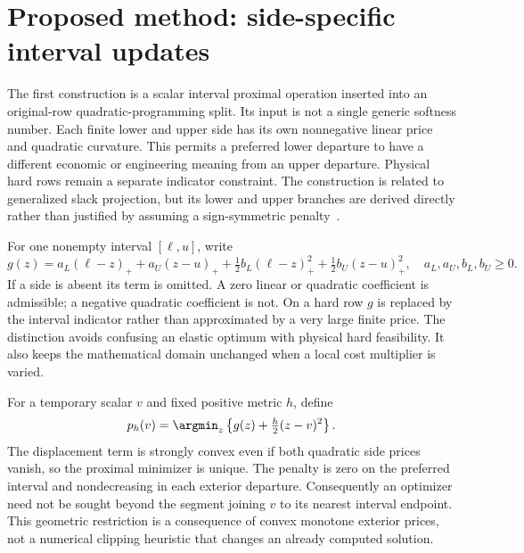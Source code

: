 \section{Proposed method: side-specific interval updates}\label{sec:separable}
The first construction is a scalar interval proximal operation inserted
into an original-row quadratic-programming split. Its input is not a
single generic softness number. Each finite lower and upper side has its
own nonnegative linear price and quadratic curvature. This permits a
preferred lower departure to have a different economic or engineering
meaning from an upper departure. Physical hard rows remain a separate
indicator constraint. The construction is related to generalized slack
projection, but its lower and upper branches are derived directly rather
than justified by assuming a sign-symmetric penalty~\cite{gsp,lew}.

For one nonempty interval $[\ell,u]$, write
\begin{equation}\label{eq:paper-side-cost}
 g(z)=a_L(\ell-z)_++a_U(z-u)_+
       +\tfrac12b_L(\ell-z)_+^2+\tfrac12b_U(z-u)_+^2,
 \quad a_L,a_U,b_L,b_U\geq0.
\end{equation}
If a side is absent its term is omitted. A zero linear or quadratic
coefficient is admissible; a negative quadratic coefficient is not. On a
hard row $g$ is replaced by the interval indicator rather than approximated
by a very large finite price. The distinction avoids confusing an elastic
optimum with physical hard feasibility. It also keeps the mathematical
domain unchanged when a local cost multiplier is varied.

For a temporary scalar $v$ and fixed positive metric $h$, define
\begin{equation}\label{eq:paper-scalar-prox}
 p_h(v)=\argmin_z\left\{g(z)+\tfrac h2(z-v)^2\right\}.
\end{equation}
The displacement term is strongly convex even if both quadratic side
prices vanish, so the proximal minimizer is unique. The penalty is zero
on the preferred interval and nondecreasing in each exterior departure.
Consequently an optimizer need not be sought beyond the segment joining
$v$ to its nearest interval endpoint. This geometric restriction is a
consequence of convex monotone exterior prices, not a numerical clipping
heuristic that changes an already computed solution.

